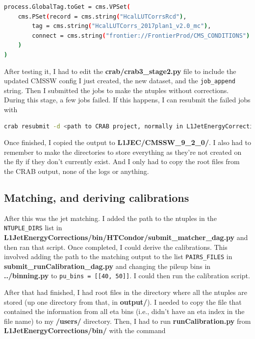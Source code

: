 \begin{lstlisting}[belowskip=-0.7cm, language=sh, numbers=none]
process.GlobalTag.toGet = cms.VPSet(
    cms.PSet(record = cms.string("HcalLUTCorrsRcd"),
        tag = cms.string("HcalLUTCorrs_2017plan1_v2.0_mc"),
        connect = cms.string("frontier://FrontierProd/CMS_CONDITIONS")
    )
)
\end{lstlisting}

After testing it, I had to edit the \textbf{crab/crab3\_stage2.py} file to include the updated CMSSW config I just created, the new dataset, and the \texttt{job\_append} string. Then I submitted the jobs to make the ntuples without corrections. During this stage, a few jobs failed. If this happens, I can resubmit the failed jobs with

\begin{lstlisting}[belowskip=-0.7cm, language=sh, numbers=none]
crab resubmit -d <path to CRAB project, normally in L1JetEnergyCorrections/crab/ directory>
\end{lstlisting}

Once finished, I copied the output to \textbf{L1JEC/CMSSW\_9\_2\_0/}. I also had to remember to make the directories to store everything as they're not created on the fly if they don't currently exist. And I only had to copy the root files from the CRAB output, none of the logs or anything.


\subsection{Matching, and deriving calibrations}

After this was the jet matching. I added the path to the ntuples in the \texttt{NTUPLE\_DIRS} list in \textbf{L1JetEnergyCorrections/bin/HTCondor/submit\_matcher\_dag.py} and then ran that script. Once completed, I could derive the calibrations. This involved adding the path to the matching output to the list \texttt{PAIRS\_FILES} in \textbf{submit\_runCalibration\_dag.py} and changing the pileup bins in \textbf{../binning.py} to \texttt{pu\_bins = [[40, 50]]}. I could then run the calibration script.

After that had finished, I had root files in the directory where all the ntuples are stored (up one directory from that, in \textbf{output/}). I needed to copy the file that contained the information from all eta bins (i.e., didn't have an eta index in the file name) to my \textbf{/users/} directory. Then, I had to run \textbf{runCalibration.py} from \textbf{L1JetEnergyCorrections/bin/} with the command

